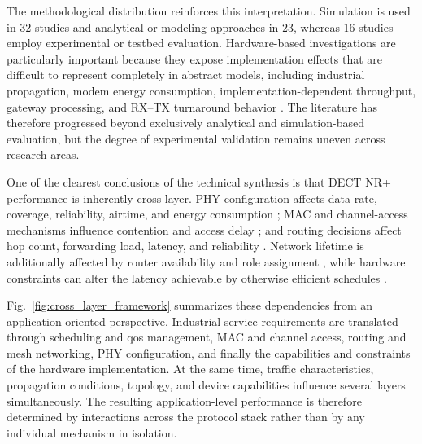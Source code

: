 The methodological distribution reinforces this interpretation. Simulation is used in 32 studies and analytical or modeling approaches in 23, whereas 16 studies employ experimental or testbed evaluation. Hardware-based investigations are particularly important because they expose implementation effects that are difficult to represent completely in abstract models, including industrial propagation, modem energy consumption, implementation-dependent throughput, gateway processing, and RX--TX turnaround behavior \cite{wassmannPerformanceDECT2020NR2024, bandaraExperimentalValidationAnalysis2025, grafWhatExpectWhen2026, piresDECT2020NREnergy2026b, alizaiMeasurementDrivenLatencyAnalysis2026}. The literature has therefore progressed beyond exclusively analytical and simulation-based evaluation, but the degree of experimental validation remains uneven across research areas.


\label{subsec:cross_layer_gaps}

One of the clearest conclusions of the technical synthesis is that DECT NR+ performance is inherently cross-layer. PHY configuration affects data rate, coverage, reliability, airtime, and energy consumption \cite{grafParetoOptimalityApproach2026a}; MAC and channel-access mechanisms influence contention and access delay \cite{samuylovPerformanceMACLayer2024a, gaidamakaOptimizingDelaysRandom2025}; and routing decisions affect hop count, forwarding load, latency, and reliability \cite{asifURLLCBasedMultiHopCommunication2025, alamDLRoutingPerformance2026a, rauwolfTopologyAwareDeepReinforcement2026a}. Network lifetime is additionally affected by router availability and role assignment \cite{nihtilaEnergyConsumptionDECT20202022, nihtilaEnergySavingRouter2022}, while hardware constraints can alter the latency achievable by otherwise efficient schedules \cite{alizaiMeasurementDrivenLatencyAnalysis2026}.

Fig.~\ref{fig:cross_layer_framework} summarizes these dependencies from an application-oriented perspective. Industrial service requirements are translated through scheduling and \gls{qos} management, MAC and channel access, routing and mesh networking, PHY configuration, and finally the capabilities and constraints of the hardware implementation. At the same time, traffic characteristics, propagation conditions, topology, and device capabilities influence several layers simultaneously. The resulting application-level performance is therefore determined by interactions across the protocol stack rather than by any individual mechanism in isolation.


